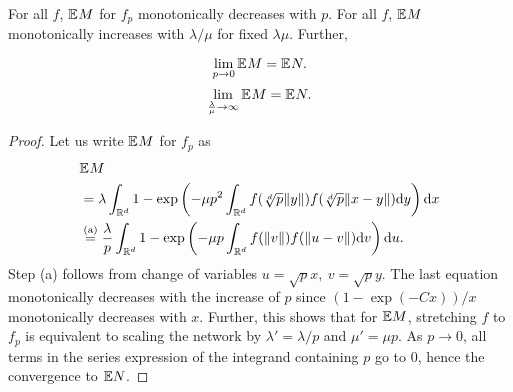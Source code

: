  \begin{corollary}
  \label{cor: dispersed-mean-degree}
   For all $f$, $\mathbb{E}^{} M$ for $f_p$ monotonically decreases with $p$. For all $f$, $\mathbb{E}^{} M$ monotonically increases with $\lambda/\mu$ for fixed $\lambda\mu$. Further,
   
  \begin{equation}
 \lim_{p\to 0} \mathbb{E}^{} M = \mathbb{E}^{} N.
  \end{equation}
  \begin{equation}
 \lim_{\frac{\lambda}{\mu}\to \infty} \mathbb{E}^{} M = \mathbb{E}^{} N.
  \end{equation}
 \end{corollary}
 \begin{proof}
Let us write $\mathbb{E}^{} M$ for $f_p$  as
 \begin{equation}
\begin{split}\nonumber
   &\mathbb{E}^{} M\\
   & = \lambda\int_{\mathbb{R}^d}  1-\exp\left(-\mu p^2\int_{\mathbb{R}^d}f(\sqrt[d]{p}\|y\|)f(\sqrt[d]{p}\|x-y\|)\mathrm{d} y\right)\mathrm{d} x\\
   &  \stackrel{\text{\scriptsize(a)}}{=} \frac{\lambda}{p}\int_{\mathbb{R}^d}   1-\exp\left(-\mu p\int_{\mathbb{R}^d}f(\|v\|)f(\|u-v\|)\mathrm{d} v\right)\mathrm{d} u.
 \end{split}
 \end{equation}
Step (a) follows from change of variables $u=\sqrt{p}x,~v=\sqrt{p}y$.
The last equation monotonically decreases with the increase of $p$ since $(1-\exp(-C x))/x$ monotonically decreases with $x$.
Further, this shows that for $\mathbb{E} M$, stretching $f$ to $f_p$ is equivalent to scaling the network by $\lambda' = \lambda/p$ and $\mu'=\mu p$.
As $p\to0$, all terms in the series expression of the integrand containing $p$ go to 0, hence the convergence to $\mathbb{E} N$.
 \end{proof}

